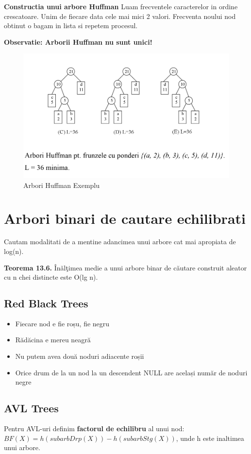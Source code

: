 \documentclass[11pt,a4paper]{article}
\theoremstyle{definition}
\theoremstyle{plain}
\theoremstyle{remark}
\begin{document}
\textbf{Constructia unui arbore Huffman}
Luam frecventele caracterelor in ordine crescatoare. Unim de fiecare data cele mai mici 2 valori. Frecventa noului nod obtinut o bagam in lista si repetem procesul.

\textbf{Observatie: Arborii Huffman nu sunt unici!}

\begin{figure}[H]
    \centering
    \includegraphics[width=0.75\linewidth]{huffman.png}
    \caption{Arbori Huffman Exemplu}
    \label{fig:enter-label}
\end{figure}

\section{Arbori binari de cautare echilibrati}

Cautam modalitati de a mentine adancimea unui arbore cat mai apropiata de log(n).

\textbf{Teorema 13.6.} Înălţimea medie a unui arbore binar de căutare construit aleator cu n chei distincte este O(lg n).

\subsection{Red Black Trees}
\begin{itemize}
    \item Fiecare nod e ﬁe roșu, ﬁe negru
    \item Rădăcina e mereu neagră
    \item Nu putem avea două noduri adiacente roșii
    \item Orice drum de la un nod la un descendent NULL are același număr de noduri negre
\end{itemize}

\subsection{AVL Trees}
Pentru AVL-uri definim \textbf{factorul de echilibru} al unui nod: $BF(X) = h(subarbDrp(X)) - h(subarbStg(X))$, unde h este inaltimea unui arbore.
\end{document}
